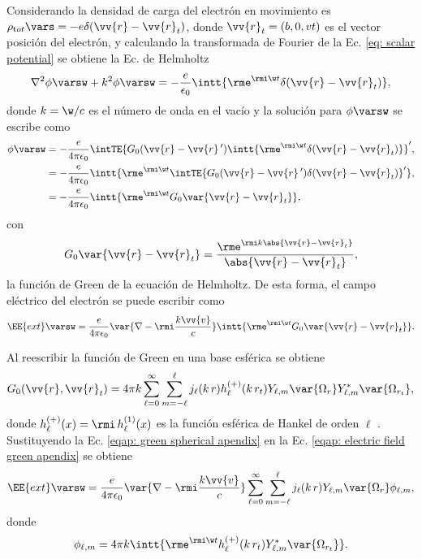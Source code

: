 Considerando la densidad de carga del electrón en movimiento es $\rho_{\text tot}\vars = -e \delta(\vv{r}-\vv{r}_t)$, donde $\vv{r}_t = (b,0,vt)$ es el vector posición del electrón, y calculando la transformada de Fourier de la Ec. \eqref{eq: scalar potential} se obtiene la Ec. de Helmholtz
\begin{equation}
\nabla^2\phi\varsw + k^2\phi\varsw = -\frac{e}{\epsilon_0}\intt{\rme^{\rmi \w t} \delta(\vv{r}-\vv{r}_t)},
\end{equation}
donde $k = \w/c$ es el número de onda en el vacío y la solución para $\phi\varsw$ se escribe como \cite{maciel2019electromagnetic, de1999relativistic,barton1989elements} 
\begin{align}
\phi\varsw &= -\frac{e}{4\pi\epsilon_0}\intTE{G_0(\vv{r}-\vv{r}\,^{\prime})\intt{\rme^{\rmi \w t}\delta(\vv{r}-\vv{r}_t)}}^{\prime},\\
		   &= -\frac{e}{4\pi\epsilon_0}\intt{\rme^{\rmi \w t} \intTE{ G_0(\vv{r}-\vv{r}\,^{\prime}) \delta(\vv{r}-\vv{r}_t)}^{\prime}},\\
		   &= -\frac{e}{4\pi\epsilon_0}\intt{\rme^{\rmi \w t}G_0\var{\vv{r}-\vv{r}_t}},
\end{align}
con 
\begin{equation}
G_0\var{\vv{r}-\vv{r}_t} = \frac{\rme^{\rmi k \abs{\vv{r}-\vv{r}_t}}}{\abs{\vv{r}-\vv{r}_t}},
\end{equation}
la función de Green de la ecuación de Helmholtz. De esta forma, el campo eléctrico del electrón se puede escribir como
\begin{equation}
\EE{ext}\varsw = \frac{e}{4\pi\epsilon_0}\var{\nabla-\rmi \frac{k\vv{v}}{c}} \intt{\rme^{\rmi \w t} G_0 \var{\vv{r}-\vv{r}_t}}. 
\label{eqap: electric field green apendix}
\end{equation}

Al reescribir la función de Green en una base esférica se obtiene 
\begin{equation}
G_0(\vv{r},\vv{r}_t)=4\pi k \sum_{\ell=0}^{\infty}\sum_{m=-\ell}^{\ell} j_{\ell}(k \, r) h_{\ell}^{(+)}(k \, r_t) Y_{\ell,m}\var{\Omega_r} Y_{\ell, m}^{*}\var{\Omega_{r_t}}, \label{eqap: green spherical apendix}
\end{equation}
donde $h_{\ell}^{(+)}(x)= \rmi \, h_{\ell}^{(1)}(x)$ es la función esférica de Hankel de orden $\ell$ \cite{abramowitz1964handbook}. Sustituyendo la Ec. \eqref{eqap: green spherical apendix} en la Ec. \eqref{eqap: electric field green apendix} se obtiene
\begin{equation}
\EE{ext}\varsw = \frac{e}{4\pi\epsilon_0}\var{\nabla-\rmi \frac{k\vv{v}}{c}} \sum_{\ell=0}^{\infty}\sum_{m=-\ell}^{\ell} j_{\ell}(k \, r) Y_{\ell,m}\var{\Omega_r} \phi_{\ell, m},
\label{eqap: ext electric field spherical}
\end{equation}
donde 
\begin{equation}
\phi_{\ell, m} = 4\pi k \intt{\rme^{\rmi \w t} h_{\ell}^{(+)}(k \, r_t) Y_{\ell, m}^{*}\var{\Omega_{r_t}}}.
\label{eqap: phi lm apendix}
\end{equation}


